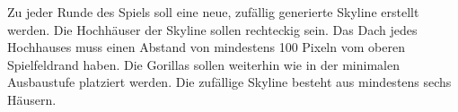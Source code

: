 Zu jeder Runde des Spiels soll eine neue, zufällig generierte Skyline erstellt werden.
Die Hochhäuser der Skyline sollen rechteckig sein. Das Dach jedes Hochhauses muss einen Abstand von mindestens
100 Pixeln vom oberen Spielfeldrand haben. Die Gorillas sollen weiterhin wie in der minimalen
Ausbaustufe platziert werden. Die zufällige Skyline besteht aus mindestens sechs Häusern.